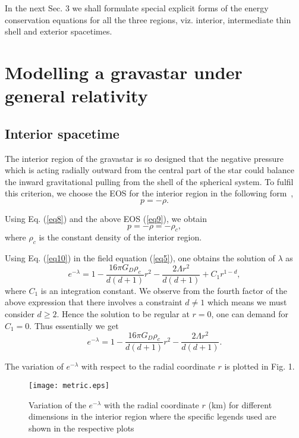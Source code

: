\documentclass[preprint,12pt]{elsarticle}
\begin{document}
In the next Sec. 3 we shall formulate special explicit forms of the
energy conservation equations for all the three regions,
viz. interior, intermediate thin shell and exterior spacetimes.


\section{Modelling a gravastar under general relativity}

\subsection{Interior spacetime}
The interior region of the gravastar is so designed that the negative pressure which is
acting radially outward from the central part of the star could balance
the inward gravitational pulling from the shell of the spherical system. To fulfil this criterion,
we choose the EOS for the interior region in the following form~\cite{Mazur2001},
\begin{equation}
p =- \rho. \label{eq9}
\end{equation}

Using  Eq. (\ref{eq8}) and the above EOS  (\ref{eq9}), we obtain
\begin{equation}
p =-\rho =- \rho_c, \label{eq10}
\end{equation}
where $\rho_c$ is the constant density of the interior region.

Using Eq. (\ref{eq10}) in the field equation (\ref{eq5}), one obtains
the solution of $\lambda$ as
\begin{equation}
e^{-\lambda} = 1-\frac{16\pi G_D\rho_c}{d(d+1)}r^2 -\frac{2\Lambda r^2}{d(d+1)}+ C_1r^{1-d},\label{eq11}
\end{equation}
where  $C_1$ is an integration constant. We observe from the fourth factor of the above expression that there involves a constraint $d \neq 1$ which means we must consider $d\geq2$. Hence the solution to be regular at $r=0$, one can demand for $C_1=0$. Thus essentially we get
\begin{equation}
e^{-\lambda} = 1-\frac{16\pi G_D\rho_c}{d(d+1)}r^2-\frac{2\Lambda r^2}{d(d+1)}.\label{eq12}
\end{equation}

The variation of $e^{-\lambda}$ with respect to the radial coordinate $r$ is plotted in Fig. 1.


\begin{figure*}[!htp]\centering
\texttt{[image: metric.eps]}
\caption{Variation of the $e^{-\lambda}$ with the radial coordinate $r$ (km) for different
dimensions in the interior region where the specific legends used are shown in the
respective plots}
\end{figure*}
\end{document}
